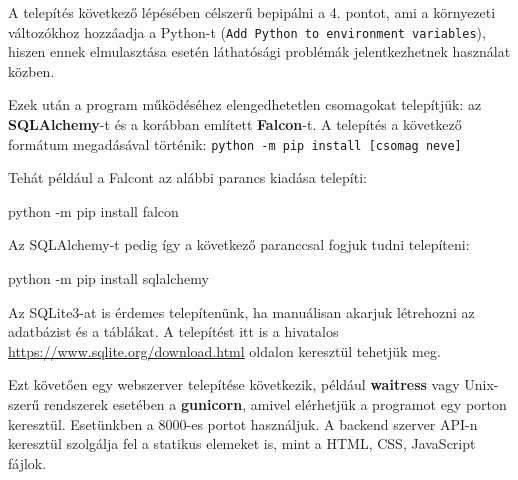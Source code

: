A telepítés következő lépésében célszerű bepipálni a 4. pontot, ami a környezeti változókhoz hozzáadja a Python-t (\texttt{Add Python to environment variables}), hiszen ennek elmulasztása esetén láthatósági problémák jelentkezhetnek használat közben.



Ezek után a program működéséhez elengedhetetlen csomagokat telepítjük: az \textbf{SQLAlchemy}-t és a korábban említett \textbf{Falcon}-t. A telepítés a következő formátum megadásával történik: \texttt{python -m pip install [csomag neve]}

Tehát például a Falcont az alábbi parancs kiadása telepíti:

\begin{python}
python -m pip install falcon
\end{python}

Az SQLAlchemy-t pedig így a következő paranccsal fogjuk tudni telepíteni:
\begin{python}
python -m pip install sqlalchemy
\end{python}

Az SQLite3-at is érdemes telepítenünk, ha manuálisan akarjuk létrehozni az adatbázist és a táblákat. A telepítést itt is a hivatalos \url{https://www.sqlite.org/download.html} oldalon keresztül tehetjük meg.

Ezt követően egy webszerver telepítése következik, például \textbf{waitress} vagy Unix-szerű rendszerek esetében a \textbf{gunicorn}, amivel elérhetjük a programot egy porton keresztül. Esetünkben a 8000-es portot használjuk. A backend szerver API-n keresztül szolgálja fel a statikus elemeket is, mint a HTML, CSS, JavaScript fájlok.
 
